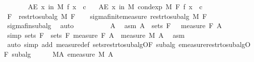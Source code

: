 \begin{isabellebody}
\ \ \ \ \ \ \ {\isachardoublequoteopen}AE\ x\ in\ M{\isachardot}{\kern0pt}\ f\ x\ {\isasymge}\ c{\isachardoublequoteclose}\isanewline
\ \ \ {\isachardoublequoteopen}AE\ x\ in\ M{\isachardot}{\kern0pt}\ cond{\isacharunderscore}{\kern0pt}exp\ M\ F\ f\ x\ {\isasymge}\ c{\isachardoublequoteclose}\isanewline
%
\isadelimproof
%
\endisadelimproof
%
\isatagproof
{}\isamarkupfalse%
\ {\isacharminus}{\kern0pt}\isanewline
\ \ \isamarkupfalse%
\ {\isacharquery}{\kern0pt}F\ {\isacharequal}{\kern0pt}\ {\isachardoublequoteopen}restr{\isacharunderscore}{\kern0pt}to{\isacharunderscore}{\kern0pt}subalg\ M\ F{\isachardoublequoteclose}\isanewline
\ \ \isamarkupfalse%
\ sigma{\isacharunderscore}{\kern0pt}finite{\isacharunderscore}{\kern0pt}measure\ {\isachardoublequoteopen}restr{\isacharunderscore}{\kern0pt}to{\isacharunderscore}{\kern0pt}subalg\ M\ F{\isachardoublequoteclose}\ \isamarkupfalse%
\ sigma{\isacharunderscore}{\kern0pt}fin{\isacharunderscore}{\kern0pt}subalg\ \isamarkupfalse%
\ auto\isanewline
\ \ \isacommand{{\isacharbraceleft}{\kern0pt}}\isamarkupfalse%
\ \isanewline
\ \ \ \ \isamarkupfalse%
\ A\ \isamarkupfalse%
\ asm{\isacharcolon}{\kern0pt}\ {\isachardoublequoteopen}A\ {\isasymin}\ sets\ {\isacharquery}{\kern0pt}F{\isachardoublequoteclose}\ {\isachardoublequoteopen}{}\ {\isacharless}{\kern0pt}\ measure\ {\isacharquery}{\kern0pt}F\ A{\isachardoublequoteclose}\isanewline
\ \ \ \ \isamarkupfalse%
\ {\isacharbrackleft}{\kern0pt}simp{\isacharbrackright}{\kern0pt}{\isacharcolon}{\kern0pt}\ {\isachardoublequoteopen}sets\ {\isacharquery}{\kern0pt}F\ {\isacharequal}{\kern0pt}\ sets\ F{\isachardoublequoteclose}\ {\isachardoublequoteopen}measure\ {\isacharquery}{\kern0pt}F\ A\ {\isacharequal}{\kern0pt}\ measure\ M\ A{\isachardoublequoteclose}\ \isamarkupfalse%
\ asm\ \isamarkupfalse%
\ {\isacharparenleft}{\kern0pt}auto\ simp\ add{\isacharcolon}{\kern0pt}\ measure{\isacharunderscore}{\kern0pt}def\ sets{\isacharunderscore}{\kern0pt}restr{\isacharunderscore}{\kern0pt}to{\isacharunderscore}{\kern0pt}subalg{\isacharbrackleft}{\kern0pt}OF\ subalg{\isacharbrackright}{\kern0pt}\ emeasure{\isacharunderscore}{\kern0pt}restr{\isacharunderscore}{\kern0pt}to{\isacharunderscore}{\kern0pt}subalg{\isacharbrackleft}{\kern0pt}OF\ subalg{\isacharbrackright}{\kern0pt}{\isacharparenright}{\kern0pt}\isanewline
\ \ \ \ \isamarkupfalse%
\ M{\isacharunderscore}{\kern0pt}A{\isacharcolon}{\kern0pt}\ {\isachardoublequoteopen}emeasure\ M\ A\ {\isacharless}{\kern0pt}\ {\isasyminfinity}{\isachardoublequoteclose}\ \isamarkupfalse%

\end{isabellebody}
